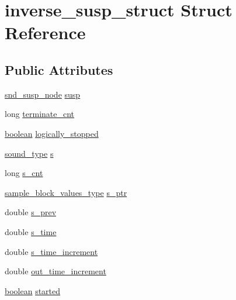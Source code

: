 \hypertarget{structinverse__susp__struct}{}\section{inverse\+\_\+susp\+\_\+struct Struct Reference}
\label{structinverse__susp__struct}
\subsection*{Public Attributes}
\begin{DoxyCompactItemize}
\item 
\hyperlink{sound_8h_a6b268203688a934bd798ceb55f85d4c0}{snd\+\_\+susp\+\_\+node} \hyperlink{structinverse__susp__struct_a3e4d8a81ba9aeb75c5798f433b7872b9}{susp}
\item 
long \hyperlink{structinverse__susp__struct_afae99e5ec29d78eef546540a92425900}{terminate\+\_\+cnt}
\item 
\hyperlink{cext_8h_a7670a4e8a07d9ebb00411948b0bbf86d}{boolean} \hyperlink{structinverse__susp__struct_a93383cac985083a74fa2bc39f6741f27}{logically\+\_\+stopped}
\item 
\hyperlink{sound_8h_a792cec4ed9d6d636d342d9365ba265ea}{sound\+\_\+type} \hyperlink{structinverse__susp__struct_a1ba42536d4e45c1731c0a6a32dd2bdf7}{s}
\item 
long \hyperlink{structinverse__susp__struct_afa1ae7c0882c610e616f285cf93db762}{s\+\_\+cnt}
\item 
\hyperlink{sound_8h_a83d17f7b465d1591f27cd28fc5eb8a03}{sample\+\_\+block\+\_\+values\+\_\+type} \hyperlink{structinverse__susp__struct_a3ef6bc40880154d13de858fe604d63e2}{s\+\_\+ptr}
\item 
double \hyperlink{structinverse__susp__struct_a02fa4f43e6e0989f887263bf7a0ba2ed}{s\+\_\+prev}
\item 
double \hyperlink{structinverse__susp__struct_a5c331c9531e0a3cad7806d42eccd98d4}{s\+\_\+time}
\item 
double \hyperlink{structinverse__susp__struct_ac369d11a35bbed9919216c35ddb4af91}{s\+\_\+time\+\_\+increment}
\item 
double \hyperlink{structinverse__susp__struct_a9438a2fbfadc862ab87cb42bf6e203e8}{out\+\_\+time\+\_\+increment}
\item 
\hyperlink{cext_8h_a7670a4e8a07d9ebb00411948b0bbf86d}{boolean} \hyperlink{structinverse__susp__struct_a73ece63594332b6cacb03dcead97e50b}{started}
\end{DoxyCompactItemize}


